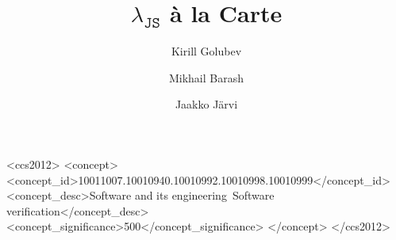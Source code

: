 \documentclass[sigplan,nonacm,review]{acmart}
\begin{document}
\title{$\lambda_{\texttt{JS}}$ à la Carte}

\author{Kirill Golubev}

\author{Mikhail Barash}

\author{Jaakko Järvi}






\renewcommand{\shortauthors}{Golubev, Barash, Järvi}

\begin{CCSXML}
<ccs2012>
 <concept>
<concept_id>10011007.10010940.10010992.10010998.10010999</concept_id>
<concept_desc>Software and its engineering~Software verification</concept_desc>
<concept_significance>500</concept_significance>
</concept>
</ccs2012>
\end{CCSXML}

\end{document}
